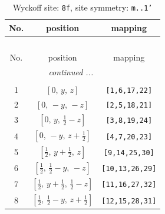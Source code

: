 \documentclass[fleqn,8pt]{jsarticle}
\begin{document}
\begin{longtable}{ccc}
\caption{Wyckoff site: {\tt 8f}, site symmetry: {\tt m..1'}}
 \\
 \hline \hline
No. & position & mapping \\ \hline \endfirsthead

\multicolumn{2}{l}{\tablename\ \thetable{}} \\
 \hline \hline
No. & position & mapping \\ \hline \endhead

 \hline \hline
\multicolumn{2}{r}{\footnotesize\it continued ...} \\ \endfoot

 \hline \hline
\multicolumn{2}{r}{} \\ \endlastfoot

1 & $\left[ 0,\, y,\, z \right]$ & {\tt [1,6,17,22]} \\ \hline
2 & $\left[ 0,\, - y,\, - z \right]$ & {\tt [2,5,18,21]} \\ \hline
3 & $\left[ 0,\, y,\, \frac{1}{2} - z \right]$ & {\tt [3,8,19,24]} \\ \hline
4 & $\left[ 0,\, - y,\, z + \frac{1}{2} \right]$ & {\tt [4,7,20,23]} \\ \hline
5 & $\left[ \frac{1}{2},\, y + \frac{1}{2},\, z \right]$ & {\tt [9,14,25,30]} \\ \hline
6 & $\left[ \frac{1}{2},\, \frac{1}{2} - y,\, - z \right]$ & {\tt [10,13,26,29]} \\ \hline
7 & $\left[ \frac{1}{2},\, y + \frac{1}{2},\, \frac{1}{2} - z \right]$ & {\tt [11,16,27,32]} \\ \hline
8 & $\left[ \frac{1}{2},\, \frac{1}{2} - y,\, z + \frac{1}{2} \right]$ & {\tt [12,15,28,31]} \\
\end{longtable}
\renewcommand{\arraystretch}{1.2}
\end{document}
